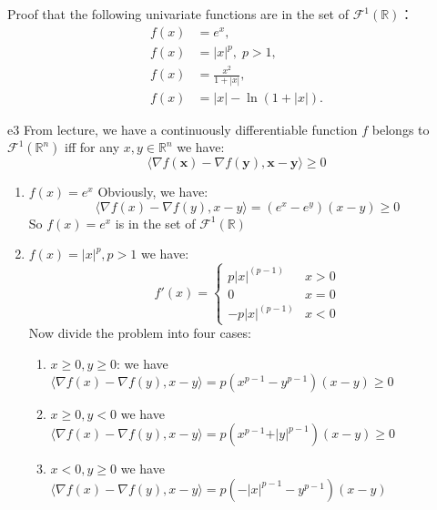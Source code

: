 \documentclass{article}
\begin{document}
\begin{excercise}\label{e3}
	Proof that the following univariate functions are in the set of $\mathcal{F}^1(\mathbb{R})$：
	\begin{align}
		f(x) &= e^x,\nonumber \\
		f(x) &= |x|^p,\; p > 1,\nonumber \\
		f(x) &= \frac{x^2}{1 + |x|},\nonumber \\
		f(x) &= |x| - \ln (1 + |x|).\nonumber
	\end{align}
\end{excercise}
\begin{PROOF}{e3}
From lecture, we have a continuously differentiable function $f$ belongs to $\mathcal{F}^1(\mathbb{R}^n)$ iff for any $x,y\in \mathbb{R}^n$ we have:
\begin{equation}
	\langle\nabla f(\bm{x})-\nabla f(\bm{y}),\bm{x}-\bm{y}\rangle\ge 0
\end{equation}
\begin{enumerate}
	\item $f(x)=e^x$
	Obviously, we have:
	\begin{equation}
		\langle\nabla f(x)-\nabla f(y),x-y\rangle=(e^x-e^y)(x-y)\ge 0
	\end{equation}
	So $f(x)=e^x$ is in the set of $\mathcal{F}^1(\mathbb{R})$
	\item $f(x)=\lvert x\rvert^p,p>1$
	we have:
	\begin{equation}
		f{'}(x)=\begin{cases}
			p\vert x\vert^{(p-1)}&x>0\\
			0&x=0\\
			-p\vert x\vert^{(p-1)}&x<0
		\end{cases}
	\end{equation}
	Now divide the problem into four cases:
	\begin{enumerate}
		\item $x\ge 0,y\ge 0$:
		we have $\langle\nabla f(x)-\nabla f(y),x-y\rangle =p(x^{p-1}-y^{p-1})(x-y)\ge 0$
		\item $x\ge 0,y<0$
		we have $\langle\nabla f(x)-\nabla f(y),x-y\rangle = p(x^{p-1}+\vert y\vert ^{p-1})(x-y)\ge 0$
		\item $x<0,y\ge 0$
		we have $\langle\nabla f(x)-\nabla f(y),x-y\rangle = p(-\vert x\vert ^{p-1}-y^{p-1})(x-y)$\\


\end{enumerate}
\end{enumerate}
\end{PROOF}
\end{document}
